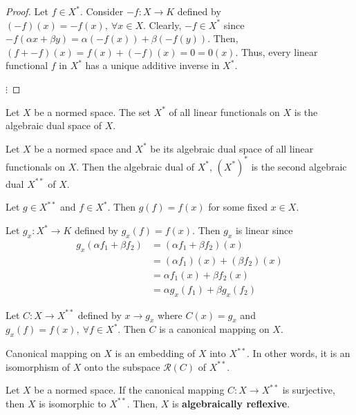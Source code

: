 \begin{commentary}
\begin{proof}
	Let $f \in X^\ast$.
	Consider $-f : X \to K$ defined by $(-f)(x) = -f(x),\ \forall x \in X$.
	Clearly, $-f \in X^\ast$ since $-f(\alpha x + \beta y) = \alpha (-f(x)) + \beta (-f(y))$.
	Then, $(f + -f)(x) = f(x) + (-f)(x) = 0 = 0(x)$.
	Thus, every linear functional $f$ in $X^\ast$ has a unique additive inverse in $X^\ast$.

	$\vdots$
\end{proof}
\end{commentary}

\begin{definition}
	Let $X$ be a normed space.
	The set $X^\ast$ of all linear functionals on $X$ is the algebraic dual space of $X$.
\end{definition}

\begin{definition}
	Let $X$ be a normed space and $X^\ast$ be its algebraic dual space of all linear functionals on $X$.
	Then the algebraic dual of $X^\ast$, $(X^\ast)^\ast$ is the second algebraic dual $X^{\ast\ast}$ of $X$.
\end{definition}

\begin{important}
\begin{remark}
	Let $g \in X^{\ast\ast}$ and $f \in X^\ast$.
	Then $g(f) = f(x)$ for some fixed $x \in X$.
\end{remark}
\end{important}

\begin{remark}
	Let $g_x : X^\ast \to K$ defined by $g_x(f) = f(x)$.
	Then $g_x$ is linear since
	\begin{align*}
		g_x(\alpha f_1 + \beta f_2) 
		& = (\alpha f_1 + \beta f_2)(x) \\
		& = (\alpha f_1)(x) + (\beta f_2)(x) \\
		& = \alpha f_1(x) + \beta f_2(x) \\
		& = \alpha g_x(f_1) + \beta g_x(f_2)
	\end{align*}
\end{remark}
\begin{definition}
	Let $C : X \to X^{\ast\ast}$ defined by $x \to g_x$ where $C(x) = g_x$ and $g_x(f) = f(x),\ \forall f \in X^\ast$.
	Then $C$ is a canonical mapping on $X$.
\end{definition}
\begin{remark}
	Canonical mapping on $X$ is an embedding of $X$ into $X^{\ast\ast}$. In other words, it is an isomorphism of $X$ onto  the subspace $\mathcal{R}(C)$ of $X^{\ast\ast}$.
\end{remark}
\begin{definition}
	Let $X$ be a normed space.
	If the canonical mapping $C : X \to X^{\ast\ast}$ is surjective, then $X$ is isomorphic to $X^{\ast\ast}$.
	Then, $X$ is \textbf{algebraically reflexive}.
\end{definition}

